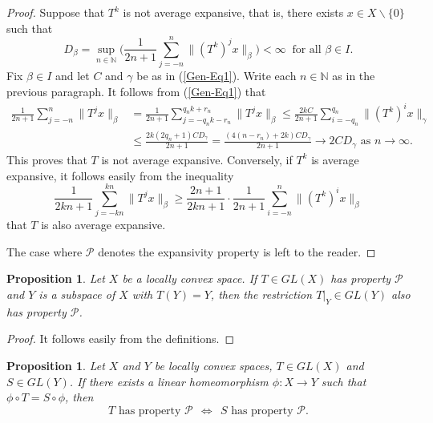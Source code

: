 \documentclass[12pt]{amsart}
\theoremstyle{theorem}
\newtheorem{proposition}[theorem]{Proposition}
\theoremstyle{definition}
\theoremstyle{remark} \theoremstyle{question} \theoremstyle{example}
\newcommand{\N}{\mathbb{N}}   %
\newcommand{\cP}{\mathcal{P}}
\begin{document}
\begin{proof}
Suppose that $T^k$ is not average expansive, that is, there exists $x \in X \backslash \{0\}$ such that
\[
D_\beta = \sup_{n \in \N} \Big(\frac{1}{2n+1} \sum_{j=-n}^n \|(T^k)^j x\|_\beta \Big) < \infty \ \text{ for all } \beta \in I.
\]
Fix $\beta \in I$ and let $C$ and $\gamma$ be as in (\ref{Gen-Eq1}). 
Write each $n \in \N$ as in the previous paragraph. 
It follows from (\ref{Gen-Eq1}) that
\begin{align*}
\frac{1}{2n+1} \sum_{j=-n}^n \|T^j x\|_\beta &= \frac{1}{2n+1} \sum_{j=-q_n k - r_n}^{q_n k + r_n} \|T^j x\|_\beta
  \leq \frac{2kC}{2n+1} \sum_{i=-q_n}^{q_n} \|(T^k)^i x\|_\gamma\\
&\leq \frac{2k (2q_n + 1)C D_\gamma}{2n+1} = \frac{(4(n - r_n) + 2k)C D_\gamma}{2n+1} \to 2CD_\gamma \text{ as } n \to \infty.
\end{align*}
This proves that $T$ is not average expansive.
Conversely, if $T^k$ is average expansive, it follows easily from the inequality
\[
\frac{1}{2kn+1} \sum_{j=-kn}^{kn} \|T^j x\|_\beta \geq \frac{2n+1}{2kn+1} \cdot \frac{1}{2n+1} \sum_{i=-n}^n \|(T^k)^i x\|_\beta
\]
that $T$ is also average expansive.

The case where $\cP$ denotes the expansivity property is left to the reader.
\end{proof}

\begin{proposition}\label{Gen-P2}
Let $X$ be a locally convex space. If $T \in GL(X)$ has property $\cP$ and $Y$ is a subspace of $X$ with $T(Y) = Y$,
then the restriction $T|_Y \in GL(Y)$ also has property $\cP$.
\end{proposition}

\begin{proof}
It follows easily from the definitions.
\end{proof}

\begin{proposition}\label{Gen-P3}
Let $X$ and $Y$ be locally convex spaces, $T \in GL(X)$ and $S \in GL(Y)$.
If there exists a linear homeomorphism $\phi : X \to Y$ such that $\phi \circ T = S \circ \phi$, then
\[
T \text{ has property } \cP \ \ \Longleftrightarrow \ \ S \text{ has property } \cP.
\]
\end{proposition}
\end{document}

